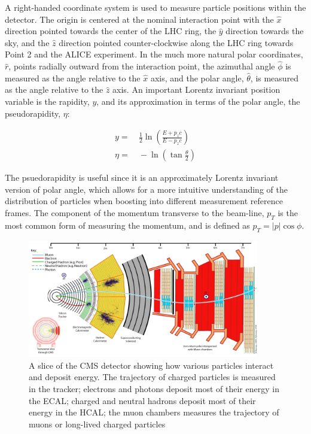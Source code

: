 \par A right-handed coordinate system is used to measure particle
positions within the detector.  The origin is centered at the nominal
interaction point with the $\hat{x}$ direction pointed towards the
center of the LHC ring, the $\hat{y}$ direction towards the sky, and
the $\hat{z}$ direction pointed counter-clockwise along the LHC ring
towards Point 2 and the ALICE experiment.  In the much more natural
polar coordinates, $\hat{r}$, points radially outward from the
interaction point, the azimuthal angle $\hat{\phi}$ is measured as the
angle relative to the $\hat{x}$ axis, and the polar angle,
$\hat{\theta}$, is measured as the angle relative to the $\hat{z}$
axis.  An important Lorentz invariant position variable is the
rapidity, $y$, and its approximation in terms of the polar angle, the
pseudorapidity, $\eta$:

\begin{equation}
\begin{aligned}
y =&~ \frac{1}{2}\ln\left({\frac{E+p_{z}c}{E-p_{z}c}}\right) \\
\eta =&~ -\ln\left(\tan{\frac{\theta}{2}}\right)
\end{aligned}
\end{equation}

\noindent The psuedorapidity is useful since it is an approximately Lorentz
invariant version of polar angle, which allows for a more intuitive
understanding of the distribution of particles when boosting into
different measurement reference frames.  The component of the momentum
transverse to the beam-line, $p_{T}$ is the most common form of
measuring the momentum, and is defined as $p_{T} = |p|\cos{\phi}$.  

\begin{figure}[h]
   \centering
  \includegraphics[width=0.9\textwidth]{Figures/CMS_Diagrams/CMS__Slice.png}
  \caption{A slice of the CMS detector showing how various particles
    interact and deposit energy.  The trajectory of charged particles
    is measured in the tracker; electrons and photons deposit most of
    their energy in the ECAL; charged and neutral hadrons deposit most
  of their energy in the HCAL; the muon chambers measures the
  trajectory of muons or long-lived charged particles} \label{fig:cms_slice}
\end{figure}

